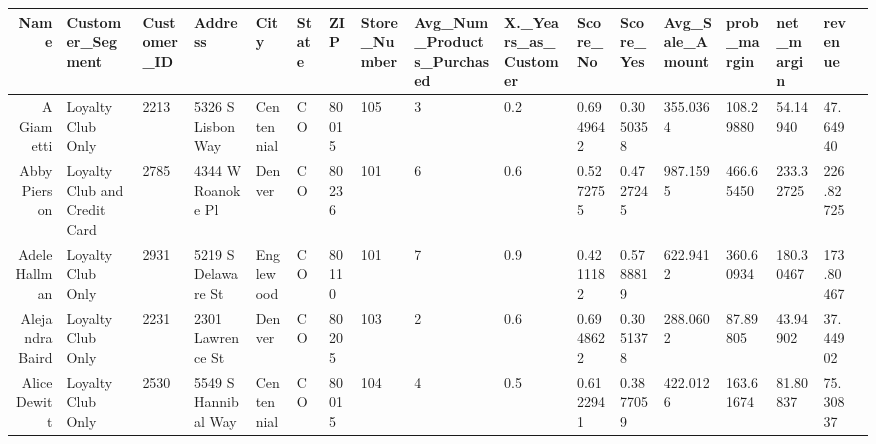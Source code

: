 \documentclass[11pt]{article}
\begin{document}
    \begin{tabular}{r|llllllllllllllll}
 Name & Customer\_Segment & Customer\_ID & Address & City & State & ZIP & Store\_Number & Avg\_Num\_Products\_Purchased & X.\_Years\_as\_Customer & Score\_No & Score\_Yes & Avg\_Sale\_Amount & prob\_margin & net\_margin & revenue\\
\hline
	 A Giametti                   & Loyalty Club Only            & 2213                         & 5326 S Lisbon Way            & Centennial                   & CO                           & 80015                        & 105                          & 3                            & 0.2                          & 0.6949642                    & 0.3050358                    & 355.0364                     & 108.29880                    &  54.14940                    &  47.64940                   \\
	 Abby Pierson                 & Loyalty Club and Credit Card & 2785                         & 4344 W Roanoke Pl            & Denver                       & CO                           & 80236                        & 101                          & 6                            & 0.6                          & 0.5272755                    & 0.4727245                    & 987.1595                     & 466.65450                    & 233.32725                    & 226.82725                   \\
	 Adele Hallman                & Loyalty Club Only            & 2931                         & 5219 S Delaware St           & Englewood                    & CO                           & 80110                        & 101                          & 7                            & 0.9                          & 0.4211182                    & 0.5788819                    & 622.9412                     & 360.60934                    & 180.30467                    & 173.80467                   \\
	 Alejandra Baird              & Loyalty Club Only            & 2231                         & 2301 Lawrence St             & Denver                       & CO                           & 80205                        & 103                          & 2                            & 0.6                          & 0.6948622                    & 0.3051378                    & 288.0602                     &  87.89805                    &  43.94902                    &  37.44902                   \\
	 Alice Dewitt                 & Loyalty Club Only            & 2530                         & 5549 S Hannibal Way          & Centennial                   & CO                           & 80015                        & 104                          & 4                            & 0.5                          & 0.6122941                    & 0.3877059                    & 422.0126                     & 163.61674                    &  81.80837                    &  75.30837                   \\

\end{tabular}
\end{document}
